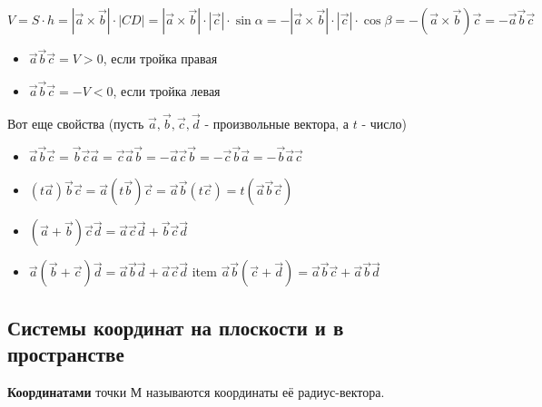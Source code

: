 \documentclass[a4paper]{article}
\begin{document}
\begin{hproof}
        \begin{equation}
            V = S \cdot h = | \vec{a} \times \vec{b} | \cdot | CD | = | \vec{a} \times \vec{b} | \cdot | \vec{c} | \cdot \sin \alpha = - | \vec{a} \times \vec{b} | \cdot | \vec{c} | \cdot \cos \beta = - (\vec{a} \times \vec{b}) \vec{c} = -\vec{a} \vec{b} \vec{c}
        \end{equation}

        \begin{itemize}
            \item $\vec{a} \vec{b} \vec{c} = V > 0$, если тройка правая
            \item $\vec{a} \vec{b} \vec{c} = -V < 0$, если тройка левая
        \end{itemize}

    \end{hproof}


    Вот еще свойства (пусть $\vec{a}, \vec{b}, \vec{c}, \vec{d}$ - произвольные вектора, а $t$ - число)
    \begin{itemize}
        \item $\vec{a} \vec{b} \vec{c} = \vec{b} \vec{c} \vec{a} = \vec{c} \vec{a} \vec{b} = -\vec{a} \vec{c} \vec{b} = -\vec{c} \vec{b} \vec{a} = -\vec{b} \vec{a} \vec{c}$
        \item $(t\vec{a}) \vec{b} \vec{c} = \vec{a} (t \vec{b}) \vec{c} = \vec{a} \vec{b} (t \vec{c}) = t (\vec{a} \vec{b} \vec{c})$
        \item $(\vec{a} + \vec{b}) \vec{c} \vec{d} = \vec{a} \vec{c} \vec{d} + \vec{b} \vec{c} \vec{d} $
        \item $\vec{a} (\vec{b} + \vec{c}) \vec{d} = \vec{a} \vec{b} \vec{d} + \vec{a} \vec{c} \vec{d}$
        item $\vec{a} \vec{b} (\vec{c} + \vec{d}) = \vec{a} \vec{b} \vec{c} + \vec{a} \vec{b} \vec{d}$
    \end{itemize}

    \newpage \begin{center}
                 \begin{Large}
                 \end{Large}
    \end{center}

    \subsection*{Системы координат на плоскости и в пространстве}
    \textbf{Координатами} точки М называются координаты её радиус-вектора.
\end{document}
